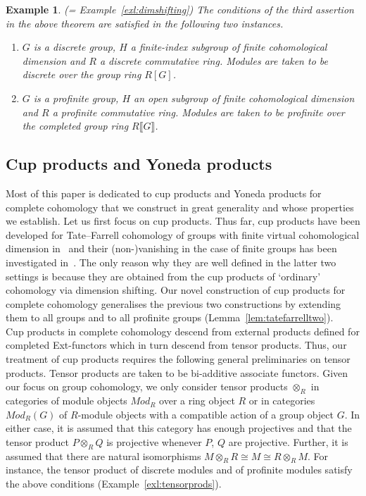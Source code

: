 \documentclass[12pt, a4paper]{article}
\numberwithin{equation}{section}
\newtheorem{exl}[thm]{Example}
\theoremstyle{empty}
\theoremstyle{nonumberplain}
\begin{document}
\begin{exl}
(= Example~\ref{exl:dimshifting}) The conditions of the third assertion in the above theorem are satisfied in the following two instances.
\begin{enumerate}
\item $G$ is a discrete group, $H$ a finite-index subgroup of finite cohomological dimension and $R$ a discrete commutative ring. Modules are taken to be discrete over the group ring $R[G]$.
\item $G$ is a profinite group, $H$ an open subgroup of finite cohomological dimension and $R$ a profinite commutative ring. Modules are taken to be profinite over the completed group ring $R{\llbracket}G{\rrbracket}$.
\end{enumerate}
\end{exl}

\subsection{Cup products and Yoneda products}\label{subsec:cohomprods}

Most of this paper is dedicated to cup products and Yoneda products for complete cohomology that we construct in great generality and whose properties we establish. Let us first focus on cup products. Thus far, cup products have been developed for Tate--Farrell cohomology of groups with finite virtual cohomological dimension in~\cite[pp.~278--279]{bro82} and their (non-)vanishing in the case of finite groups has been investigated in~\cite{ben92}. The only reason why they are well defined in the latter two settings is because they are obtained from the cup products of `ordinary' cohomology via dimension shifting. Our novel construction of cup products for complete cohomology generalises the previous two constructions by extending them to all groups and to all profinite groups (Lemma~\ref{lem:tatefarrelltwo}). \\

Cup products in complete cohomology descend from external products defined for completed Ext-functors which in turn descend from tensor products. Thus, our treatment of cup products requires the following general preliminaries on tensor products. Tensor products are taken to be bi-additive associate functors. Given our focus on group cohomology, we only consider tensor products $\otimes_R$ in categories of module objects $Mod_R$ over a ring object $R$ or in categories $Mod_R(G)$ of $R$-module objects with a compatible action of a group object $G$. In either case, it is assumed that this category has enough projectives and that the tensor product $P \otimes_R Q$ is projective whenever $P$, $Q$ are projective. Further, it is assumed that there are natural isomorphisms $M \otimes_R R \cong M \cong R \otimes_R M$. For instance, the tensor product of discrete modules and of profinite modules satisfy the above conditions (Example~\ref{exl:tensorprods}).
\end{document}
